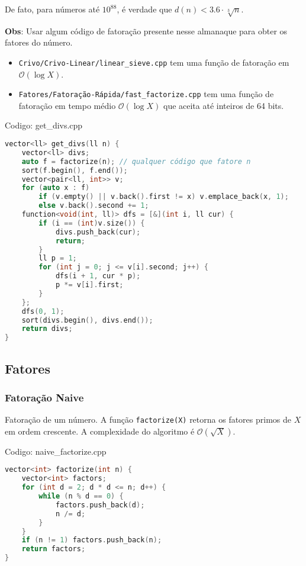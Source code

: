 \documentclass[10pt, a4paper, oneside]{book}
\begin{document}
De fato, para números até $10^{88}$, é verdade que $d(n) < 3.6 \cdot \sqrt[3]{n}$.



\textbf{Obs}: Usar algum código de fatoração presente nesse almanaque para obter os fatores do número.

\begin{itemize}
\item \texttt{Crivo/Crivo-Linear/linear\_sieve.cpp} tem uma função de fatoração em $\mathcal{O}(\log X)$.
\item \texttt{Fatores/Fatoração-Rápida/fast\_factorize.cpp} tem uma função de fatoração em tempo médio $\mathcal{O}(\log X)$ que aceita até inteiros de 64 bits.
\end{itemize}

\hfill

Codigo: get\_divs.cpp

\begin{lstlisting}[language=C++]
vector<ll> get_divs(ll n) {
    vector<ll> divs;
    auto f = factorize(n); // qualquer código que fatore n
    sort(f.begin(), f.end());
    vector<pair<ll, int>> v;
    for (auto x : f)
        if (v.empty() || v.back().first != x) v.emplace_back(x, 1);
        else v.back().second += 1;
    function<void(int, ll)> dfs = [&](int i, ll cur) {
        if (i == (int)v.size()) {
            divs.push_back(cur);
            return;
        }
        ll p = 1;
        for (int j = 0; j <= v[i].second; j++) {
            dfs(i + 1, cur * p);
            p *= v[i].first;
        }
    };
    dfs(0, 1);
    sort(divs.begin(), divs.end());
    return divs;
}\end{lstlisting}
\hfill

\subsection{Fatores}
\subsubsection{Fatoração Naive}


Fatoração de um número. A função \texttt{factorize(X)} retorna os fatores primos de $X$ em ordem crescente. A complexidade do algoritmo é $\mathcal{O}(\sqrt{X})$.
\hfill

Codigo: naive\_factorize.cpp

\begin{lstlisting}[language=C++]
vector<int> factorize(int n) {
    vector<int> factors;
    for (int d = 2; d * d <= n; d++) {
        while (n % d == 0) {
            factors.push_back(d);
            n /= d;
        }
    }
    if (n != 1) factors.push_back(n);
    return factors;
}
\end{lstlisting}
\hfill
\end{document}
